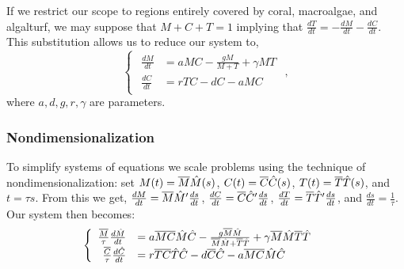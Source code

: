 \begin{frame}
If we restrict our scope to regions entirely covered by coral, macroalgae, and algalturf, we may suppose that $M+C+T=1$ implying that  $\frac{dT}{dt}=-\frac{dM}{dt}-\frac{dC}{dt}$. This substitution allows us to  reduce our system to, $$\begin{cases} 
\begin{array}{rl}
\frac{dM}{dt}&= aMC-\frac{gM}{M+T} + \gamma MT\\ 
\frac{dC}{dt}&=rTC-dC-aMC
\end{array} \end{cases},$$ where $a,d,g,r,\gamma$ are parameters.
\end{frame}

\begin{frame}
  \frametitle{Nondimensionalization}
  To simplify systems of equations we scale problems using the technique of nondimensionalization: set $M(t)=\overline{M}\HAT{M}(s)$, $C(t)=\overline{C}\HAT{C}(s)$, $T(t)=\overline{T}\HAT{T}(s)$, and $t=\tau s$. From this we get, $\frac{dM}{dt}=\overline{M}\HAT{M}'\frac{ds}{dt}$, $\frac{dC}{dt}=\overline{C}\HAT{C}'\frac{ds}{dt}$, $\frac{dT}{dt}=\overline{T}\HAT{T}'\frac{ds}{dt}$, and $\frac{ds}{dt}=\frac{1}{\tau}$. Our system then becomes: $$\begin{cases} 
\begin{array}{rl}
\frac{\overline{M}}{\tau}\frac{d\HAT{M}}{dt}&= a\overline{M}\overline{C}\HAT{M}\HAT{C}-\frac{g\overline{M}\HAT{M}}{\overline{M}\HAT{M}+\overline{T}\HAT{T}} + \gamma \overline{M}\HAT{M}\overline{T}\HAT{T}\\ 
\frac{\overline{C}}{\tau}\frac{d\HAT{C}}{dt}&=r\overline{T}\overline{C}\HAT{T}\HAT{C}-d\overline{C}\HAT{C}-a\overline{M}\overline{C}\HAT{M}\HAT{C}
\end{array} \end{cases}$$
\end{frame}
